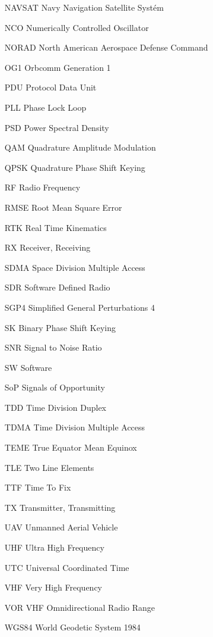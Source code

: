 \begin{itemize}
\item[NAVSAT   ] Navy Navigation Satellite Systém           
\item[NCO      ] Numerically Controlled Oscillator       
\item[NORAD    ] North American Aerospace Defense Command
\item[OG1      ] Orbcomm Generation 1                    
\item[PDU      ] Protocol Data Unit                      
\item[PLL      ] Phase Lock Loop                         
\item[PSD      ] Power Spectral Density                  
\item[QAM      ] Quadrature Amplitude Modulation            
\item[QPSK     ] Quadrature Phase Shift Keying           
\item[RF       ] Radio Frequency                         
\item[RMSE     ] Root Mean Square Error                  
\item[RTK      ] Real Time Kinematics                    
\item[RX       ] Receiver, Receiving                     
\item[SDMA     ] Space Division Multiple Access          
\item[SDR      ] Software Defined Radio                  
\item[SGP4     ] Simplified General Perturbations 4      
\item[SK       ] Binary Phase Shift Keying                  
\item[SNR      ] Signal to Noise Ratio                   
\item[SW       ] Software                                
\item[SoP      ] Signals of Opportunity                     
\item[TDD      ] Time Division Duplex                    
\item[TDMA     ] Time Division Multiple Access           
\item[TEME     ] True Equator Mean Equinox               
\item[TLE      ] Two Line Elements                       
\item[TTF      ] Time To Fix                             
\item[TX       ] Transmitter, Transmitting               
\item[UAV      ] Unmanned Aerial Vehicle                 
\item[UHF      ] Ultra High Frequency                    
\item[UTC      ] Universal Coordinated Time              
\item[VHF      ] Very High Frequency                     
\item[VOR      ] VHF Omnidirectional Radio Range         
\item[WGS84    ] World Geodetic System 1984                       
\end{itemize}
